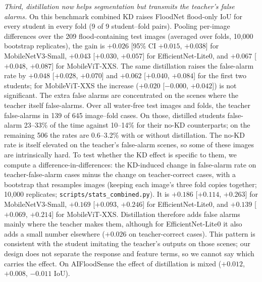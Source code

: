 \emph{Third, distillation now helps segmentation but transmits the teacher's false alarms.} On this benchmark combined KD raises FloodNet flood-only IoU for every student in every fold (9 of 9 student--fold pairs). Pooling per-image differences over the 209 flood-containing test images (averaged over folds, 10{,}000 bootstrap replicates), the gain is $+0.026$ [95\% CI $+0.015$, $+0.038$] for MobileNetV3-Small, $+0.043$ [$+0.030$, $+0.057$] for EfficientNet-Lite0, and $+0.067$ [$+0.048$, $+0.087$] for MobileViT-XXS. The same distillation raises the false-alarm rate by $+0.048$ [$+0.028$, $+0.070$] and $+0.062$ [$+0.040$, $+0.084$] for the first two students; for MobileViT-XXS the increase ($+0.020$ [$-0.000$, $+0.042$]) is not significant. The extra false alarms are concentrated on the scenes where the teacher itself false-alarms. Over all water-free test images and folds, the teacher false-alarms in 139 of 645 image--fold cases. On those, distilled students false-alarm 23--33\% of the time against 10--14\% for their no-KD counterparts; on the remaining 506 the rates are 0.6--3.2\% with or without distillation. The no-KD rate is itself elevated on the teacher's false-alarm scenes, so some of these images are intrinsically hard. To test whether the KD effect is specific to them, we compute a difference-in-differences: the KD-induced change in false-alarm rate on teacher-false-alarm cases minus the change on teacher-correct cases, with a bootstrap that resamples images (keeping each image's three fold copies together; 10{,}000 replicates; \texttt{scripts/stats\_combined.py}). It is $+0.186$ [$+0.114$, $+0.263$] for MobileNetV3-Small, $+0.169$ [$+0.093$, $+0.246$] for EfficientNet-Lite0, and $+0.139$ [$+0.069$, $+0.214$] for MobileViT-XXS. Distillation therefore adds false alarms mainly where the teacher makes them, although for EfficientNet-Lite0 it also adds a small number elsewhere ($+0.026$ on teacher-correct cases). This pattern is consistent with the student imitating the teacher's outputs on those scenes; our design does not separate the response and feature terms, so we cannot say which carries the effect. On AIFloodSense the effect of distillation is mixed ($+0.012$, $+0.008$, $-0.011$ IoU).


